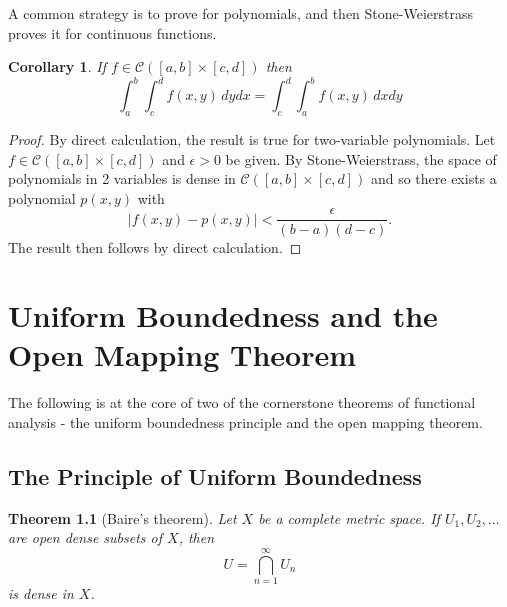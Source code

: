 \documentclass[10pt, oneside, reqno]{amsbook}
\theoremstyle{plain}%
\newtheorem{thm}{Theorem}[section]
\newtheorem*{cor}{Corollary}
\theoremstyle{definition}
\theoremstyle{remark}
\begin{document}
A common strategy is to prove for polynomials, and then Stone-Weierstrass proves it for continuous functions.  
\begin{cor}
    If $ f \in \mathcal C([a,b] \times [c,d])$ then \[
        \int_a^b \int_c^d f(x,y) \, dy dx = \int_c^d \int_a^b f(x,y) \, dx dy
    \]
\end{cor}

\begin{proof}
    By direct calculation, the result is true for two-variable polynomials.  Let $f \in \mathcal C([a,b] \times [c,d])$ and $\epsilon > 0$ be given.  By Stone-Weierstrass, the space of polynomials in 2 variables is dense in $\mathcal C([a,b] \times [c,d])$ and so there exists a polynomial $p(x,y)$ with \[
        |f(x,y) - p(x,y)| < \frac{\epsilon}{(b-a)(d-c)}.
    \]  The result then follows by direct calculation.
\end{proof}


\chapter{Uniform Boundedness and the Open Mapping Theorem}

The following is at the core of two of the cornerstone theorems of functional analysis - the uniform boundedness principle and the open mapping theorem.

\section{The Principle of Uniform Boundedness}

\begin{thm}[Baire's theorem]
    Let $X$ be a complete metric space.  If $U_1, U_2, \dots$ are open dense subsets of $X$, then \[
        U = \bigcap_{n=1}^\infty U_n
    \] is dense in $X$.  
\end{thm}
\end{document}
